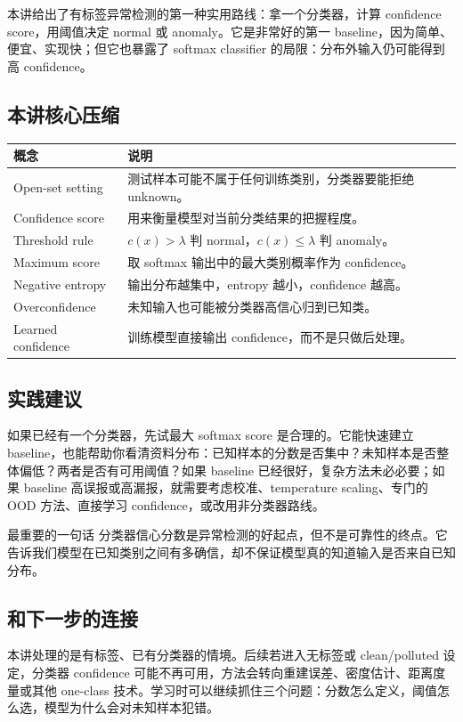\documentclass[a4paper]{article}
\begin{document}
本讲给出了有标签异常检测的第一种实用路线：拿一个分类器，计算 confidence score，用阈值决定 normal 或 anomaly。它是非常好的第一 baseline，因为简单、便宜、实现快；但它也暴露了 softmax classifier 的局限：分布外输入仍可能得到高 confidence。

\subsection{本讲核心压缩}

\begin{center}
\begin{tabular}{L{3.3cm} L{9.2cm}}
\toprule
概念 & 说明 \\
\midrule
Open-set setting & 测试样本可能不属于任何训练类别，分类器要能拒绝 unknown。 \\
Confidence score & 用来衡量模型对当前分类结果的把握程度。 \\
Threshold rule & $c(x)>\lambda$ 判 normal，$c(x)\le\lambda$ 判 anomaly。 \\
Maximum score & 取 softmax 输出中的最大类别概率作为 confidence。 \\
Negative entropy & 输出分布越集中，entropy 越小，confidence 越高。 \\
Overconfidence & 未知输入也可能被分类器高信心归到已知类。 \\
Learned confidence & 训练模型直接输出 confidence，而不是只做后处理。 \\
\bottomrule
\end{tabular}
\end{center}

\subsection{实践建议}

如果已经有一个分类器，先试最大 softmax score 是合理的。它能快速建立 baseline，也能帮助你看清资料分布：已知样本的分数是否集中？未知样本是否整体偏低？两者是否有可用阈值？如果 baseline 已经很好，复杂方法未必必要；如果 baseline 高误报或高漏报，就需要考虑校准、temperature scaling、专门的 OOD 方法、直接学习 confidence，或改用非分类器路线。

\begin{importantbox}{最重要的一句话}
    分类器信心分数是异常检测的好起点，但不是可靠性的终点。它告诉我们模型在已知类别之间有多确信，却不保证模型真的知道输入是否来自已知分布。
\end{importantbox}

\subsection{和下一步的连接}

本讲处理的是有标签、已有分类器的情境。后续若进入无标签或 clean/polluted 设定，分类器 confidence 可能不再可用，方法会转向重建误差、密度估计、距离度量或其他 one-class 技术。学习时可以继续抓住三个问题：分数怎么定义，阈值怎么选，模型为什么会对未知样本犯错。
\end{document}
